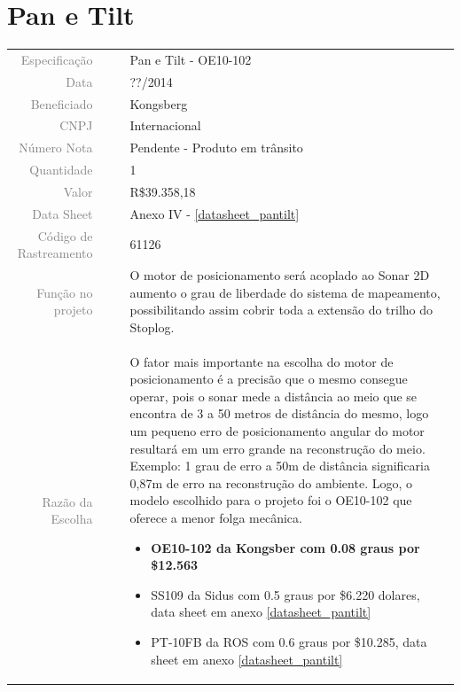 

\section{Pan e Tilt}
\label{encoder}


\begin{table}[ht!]

	\begin{tabular}{r l|l p{12cm} }
		
		\textcolor{gray}{Especificação} &&& 	{Pan e Tilt - OE10-102}\\
		\textcolor{gray}{Data} &&& 				{??/2014}\\
        \textcolor{gray}{Beneficiado} &&&		{Kongsberg} \\
        \textcolor{gray}{CNPJ} &&& 				{Internacional} \\
        \textcolor{gray}{Número Nota} &&& 		{Pendente - Produto em trânsito} \\
		\textcolor{gray}{Quantidade} &&& 		{1} \\
		\textcolor{gray}{Valor} &&& 			{R\$39.358,18} \\
		\textcolor{gray}{Data Sheet} &&& 		{Anexo IV - \ref{datasheet_pantilt} } \\
		\textcolor{gray}{Código de Rastreamento} &&& {61126} \\

		\textcolor{gray}{Função no projeto} &&& {O motor de posicionamento será acoplado ao Sonar 2D aumento o grau de liberdade do sistema de mapeamento, possibilitando assim cobrir toda a extensão do trilho do Stoplog.} \\
		\textcolor{gray}{Razão da Escolha} &&& {O fator mais importante na escolha do motor de posicionamento é a precisão que o mesmo consegue operar, pois o sonar mede a distância ao meio que se encontra de 3 a 50 metros de distância do mesmo, logo um pequeno erro de posicionamento angular do motor resultará em um erro grande na reconstrução do meio. Exemplo: 1 grau de erro a 50m de distância significaria 0,87m de erro na reconstrução do ambiente. Logo, o modelo escolhido para o projeto foi o OE10-102 que oferece a menor folga mecânica. 
		\begin{itemize}
		  \item \textbf{OE10-102 da Kongsber com 0.08 graus por \$12.563} 
		  \item SS109 da Sidus com 0.5 graus por \$6.220 dolares, data sheet em anexo \ref{datasheet_pantilt} 
		  \item PT-10FB da ROS com 0.6 graus por \$10.285, data sheet em anexo \ref{datasheet_pantilt} 
		\end{itemize}}
		

	\end{tabular}
\end{table}

